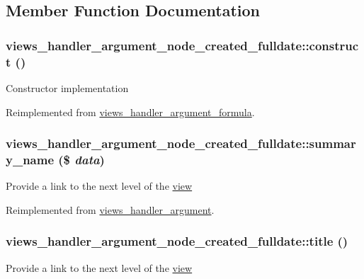 \subsection{Member Function Documentation}
\hypertarget{classviews__handler__argument__node__created__fulldate_af5b74c0204c9da9285cbe3e07ebed345}{
\subsubsection[{construct}]{\setlength{\rightskip}{0pt plus 5cm}views\_\-handler\_\-argument\_\-node\_\-created\_\-fulldate::construct ()}}
\label{classviews__handler__argument__node__created__fulldate_af5b74c0204c9da9285cbe3e07ebed345}
Constructor implementation 

Reimplemented from \hyperlink{classviews__handler__argument__formula_a01284402427de2bcfa1b1da5792a2332}{views\_\-handler\_\-argument\_\-formula}.\hypertarget{classviews__handler__argument__node__created__fulldate_ab3d201e95c5307b166a85add6cfdebe2}{
\subsubsection[{summary\_\-name}]{\setlength{\rightskip}{0pt plus 5cm}views\_\-handler\_\-argument\_\-node\_\-created\_\-fulldate::summary\_\-name (\$ {\em data})}}
\label{classviews__handler__argument__node__created__fulldate_ab3d201e95c5307b166a85add6cfdebe2}
Provide a link to the next level of the \hyperlink{classview}{view} 

Reimplemented from \hyperlink{classviews__handler__argument_a4c55a340453eed4d35c69f7ac790cac1}{views\_\-handler\_\-argument}.\hypertarget{classviews__handler__argument__node__created__fulldate_a7e071511e9b2523b875b4ba983bbb8f2}{
\subsubsection[{title}]{\setlength{\rightskip}{0pt plus 5cm}views\_\-handler\_\-argument\_\-node\_\-created\_\-fulldate::title ()}}
\label{classviews__handler__argument__node__created__fulldate_a7e071511e9b2523b875b4ba983bbb8f2}
Provide a link to the next level of the \hyperlink{classview}{view} 

